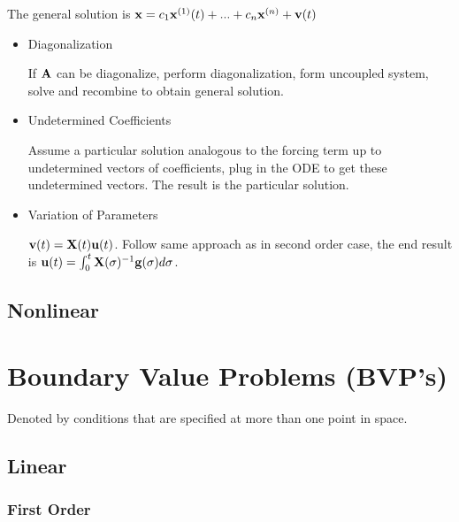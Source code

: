 \documentclass[11pt]{article}
\begin{document}
\begin{itemize}
		The general solution is $\bold{x}=c_1\bold{x}^{(1)}(t)+...+c_n\bold{x}^{(n)}+\bold{v}(t)$
			\begin{itemize}
			\item{Diagonalization}
			
			If $\bold{A}$ can be diagonalize, perform diagonalization, form uncoupled system, solve and recombine to obtain general solution. 
			\item{Undetermined Coefficients}
			
			Assume a particular solution analogous to the forcing term up to undetermined vectors of coefficients, plug in the ODE to get these undetermined vectors. The result is the particular solution.
			\item{Variation of Parameters}
			
			$\bold{v}(t)=\bold{X}(t)\bold{u}(t)$. Follow same approach as in second order case, the end result is $\bold{u}(t)=\int_0^t\bold{X}(\sigma)^{-1}\bold{g}(\sigma)d\sigma$.
			\end{itemize}
		\end{itemize}
\subsection{Nonlinear}

\section{Boundary Value Problems (BVP's)}
Denoted by conditions that are specified at more than one point in space.
\subsection{Linear}
\subsubsection{First Order}
\end{document}
